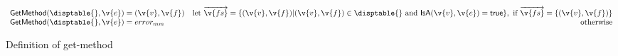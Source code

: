 \begin{figure*}
$$
\begin{array}{lr}

  \getmethod {\disptable{}}
             {\v{e}}
             {\roundpair{\v{v}}{\v{f}}}

             & 
             \text{let } {\overrightarrow{\v{fs}}} = 
                \{ (\v{v}, \v{f}) | 
                    {\roundpair{\v{v}}{\v{f}}} \in \disptable{} 
                  \text{ and } 
                \isaopsem{\v{v}}{\v{e}} = {\true{}} \},
             \text{ if } {\overrightarrow{\v{fs}}} = \{{\roundpair{\v{v}}{\v{f}}}\}

             \\
  \getmethod {\disptable{}}
             {\v{e}}
             {\mmerror{}} & \text{otherwise}

\end{array}
$$
\caption{Definition of get-method}
\end{figure*}
